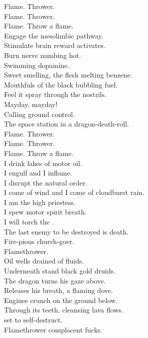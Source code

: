 Flame. Thrower. \\
Flame. Thrower. \\
Flame. Throw a flame. \\

Engage the mesolimbic pathway. \\
Stimulate brain reward activates. \\
Burn nerve numbing hot. \\
Swimming dopamine. \\
Sweet smelling, the flesh melting benzene. \\
Mouthfuls of the black bubbling fuel. \\
Feel it spray through the  nostrils. \\
Mayday, mayday! \\
Calling ground control. \\
The space station in a dragon-death-roll. \\

Flame. Thrower. \\
Flame. Thrower. \\
Flame. Throw a flame. \\

I drink lakes of motor oil. \\
I engulf and I inflame. \\
I disrupt the natural order. \\
I come of wind and I come of cloudburst rain. \\
I am the high priestess. \\
I spew motor spirit breath. \\
I will torch the . \\
The last enemy to be destroyed is death. \\
Fire-pious church-goer. \\
Flamethrower. \\

Oil wells drained of fluids. \\
Underneath stand black gold druids. \\
The dragon turns his gaze above. \\
Releases his breath, a flaming dove. \\
Engines crunch on the ground below. \\
Through its teeth, cleansing lava flows. \\
 set to self-destruct. \\
Flamethrower complacent fucks. \\

